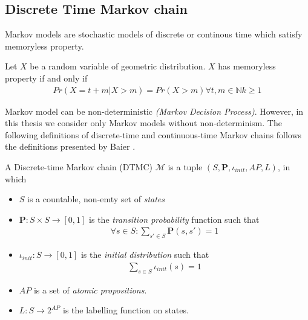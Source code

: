 \subsection{Discrete Time Markov chain}
Markov models are stochastic models of discrete or continous time which satisfy memoryless property.
\begin{definition}
      Let $X$ be a random variable of geometric distribution. $X$ has memoryless property if and only if
      \begin{align*}
            Pr(X = t + m | X > m) = Pr(X > m) \forall t,m \in \mathbb{N} k \geq 1
      \end{align*}
\end{definition}
Markov model can be non-deterministic \textit{(Markov Decision Process)}. However, in this thesis we
consider only Markov models without non-determinism. The following definitions of discrete-time and
continuous-time Markov chains follows the definitions presented by Baier \cite{baier2008principles}.
\begin{definition}
      A Discrete-time Markov chain (DTMC) $\mathcal{M}$ is a tuple $(S,\mathbf{P}, \iota_{init}, AP, L)$,
      in which
      \begin{itemize}
            \item $S$ is a countable, non-emty set of \textit{states}
            \item $\mathbf{P}:S\times S \rightarrow [0,1]$ is the \textit{transition probability}
                  function such that
                  \begin{align*}
                        \forall s \in S : \sum_{s'\in S}\mathbf{P}(s, s') = 1
                  \end{align*}
            \item $\iota_{init}: S \rightarrow [0,1]$ is the \textit{initial distribution} such that
                  \begin{align*}
                        \sum_{s\in S} \iota_{init}(s) = 1
                  \end{align*}
            \item $AP$ is a set of \textit{atomic propositions}.
            \item $L: S \rightarrow 2^{AP}$ is the labelling function on states.
      \end{itemize}
\end{definition}

